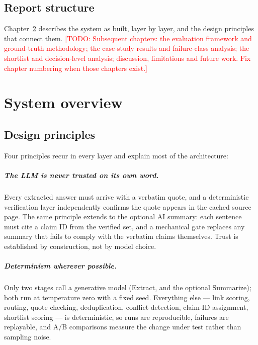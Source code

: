 \documentclass[11pt,a4paper]{report}
\newcommand{\todo}[1]{\textcolor{red}{[TODO: #1]}}
\begin{document}
\section{Report structure}

Chapter~\ref{ch:system} describes the system as built, layer by layer, and
the design principles that connect them. \todo{Subsequent chapters: the
evaluation framework and ground-truth methodology; the case-study results
and failure-class analysis; the shortlist and decision-level analysis;
discussion, limitations and future work. Fix chapter numbering when those
chapters exist.}

\chapter{System overview}
\label{ch:system}

\section{Design principles}

Four principles recur in every layer and explain most of the architecture:

\paragraph{The LLM is never trusted on its own word.} Every extracted answer
must arrive with a verbatim quote, and a deterministic verification layer
independently confirms the quote appears in the cached source page. The same
principle extends to the optional AI summary: each sentence must cite a
claim ID from the verified set, and a mechanical gate replaces any summary
that fails to comply with the verbatim claims themselves. Trust is
established by construction, not by model choice.

\paragraph{Determinism wherever possible.} Only two stages call a generative
model (Extract, and the optional Summarize); both run at temperature zero
with a fixed seed. Everything else --- link scoring, routing, quote checking,
deduplication, conflict detection, claim-ID assignment, shortlist scoring ---
is deterministic, so runs are reproducible, failures are replayable, and
A/B comparisons measure the change under test rather than sampling noise.
\end{document}
